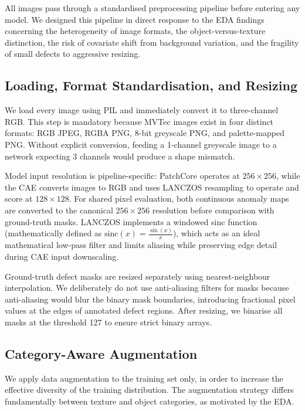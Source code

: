 \documentclass[11pt, a4paper]{article}
\begin{document}
All images pass through a standardised preprocessing pipeline before entering any model. We designed this pipeline in direct response to the EDA findings concerning the heterogeneity of image formats, the object-versus-texture distinction, the risk of covariate shift from background variation, and the fragility of small defects to aggressive resizing.

\subsection{Loading, Format Standardisation, and Resizing}

We load every image using PIL and immediately convert it to three-channel RGB. This step is mandatory because MVTec images exist in four distinct formats: RGB JPEG, RGBA PNG, 8-bit greyscale PNG, and palette-mapped PNG. Without explicit conversion, feeding a 1-channel greyscale image to a network expecting 3 channels would produce a shape mismatch.

Model input resolution is pipeline-specific: PatchCore operates at $256 \times 256$, while the CAE converts images to RGB and uses LANCZOS resampling to operate and score at $128 \times 128$. For shared pixel evaluation, both continuous anomaly maps are converted to the canonical $256 \times 256$ resolution before comparison with ground-truth masks. LANCZOS implements a windowed sinc function (mathematically defined as $\text{sinc}(x) = \frac{\sin(x)}{x}$), which acts as an ideal mathematical low-pass filter and limits aliasing while preserving edge detail during CAE input downscaling.

Ground-truth defect masks are resized separately using nearest-neighbour interpolation. We deliberately do not use anti-aliasing filters for masks because anti-aliasing would blur the binary mask boundaries, introducing fractional pixel values at the edges of annotated defect regions. After resizing, we binarise all masks at the threshold 127 to ensure strict binary arrays.

\subsection{Category-Aware Augmentation}

We apply data augmentation to the training set only, in order to increase the effective diversity of the training distribution. The augmentation strategy differs fundamentally between texture and object categories, as motivated by the EDA.
\end{document}
